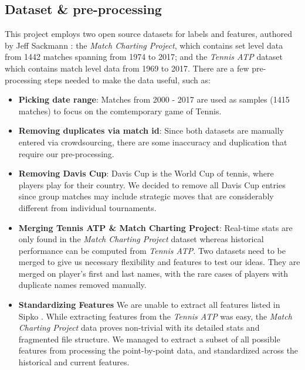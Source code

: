 \documentclass[paper=a4, fontsize=10pt]{scrartcl} %
\numberwithin{equation}{section} %
\numberwithin{figure}{section} %
\numberwithin{table}{section} %
\begin{document}
\subsection{Dataset \& pre-processing}
This project employs two open source datasets for labels and features, authored by Jeff Sackmann \cite{tennis_atp}\cite{tennis_charting}: the \textit{Match Charting Project}, which contains set level data from 1442 matches spanning from 1974 to 2017; and the \textit{Tennis ATP} dataset which contains match level data from 1969 to 2017. There are a few pre-processing steps needed to make the data useful, such as: 
\begin{itemize}
\item \textbf{Picking date range}: Matches from 2000 - 2017 are used as samples (1415 matches) to focus on the comtemporary game of Tennis.
\item \textbf{Removing duplicates via match id}: Since both datasets are manually entered via crowdsourcing, there are some inaccuracy and duplication that require our pre-processing.
\item \textbf{Removing Davis Cup}: Davis Cup is the World Cup of tennis, where players play for their country.  We decided to remove all Davis Cup entries since group matches may include strategic moves that are considerably different from individual tournaments.
\item \textbf{Merging Tennis ATP \& Match Charting Project}: Real-time stats are only found in the \textit{Match Charting Project} dataset whereas historical performance can be computed from \textit{Tennis ATP}. Two datasets need to be merged to give us necessary flexibility and features to test our ideas. They are merged on player's first and last names, with the rare cases of players with duplicate names removed manually.
\item \textbf{Standardizing Features} We are unable to extract all features listed in Sipko \cite{tennis1}. While extracting features from the \textit{Tennis ATP} was easy, the \textit{Match Charting Project} data proves non-trivial with its detailed stats and fragmented file structure.  We managed to extract a subset of all possible features from processing the point-by-point data, and standardized across the historical and current features.
\end{itemize}
\end{document}
